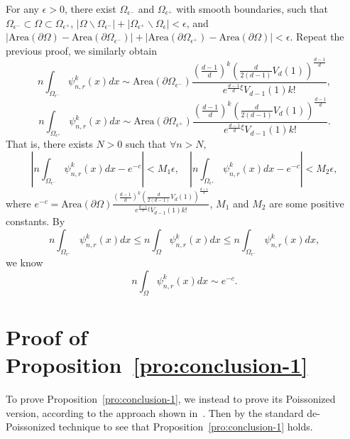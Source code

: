 \documentclass[preprint,12pt]{elsarticle}
\begin{document}
 For any $\epsilon>0$, there exist  $\Omega_{\epsilon^-} $  and $  \Omega_{\epsilon^+}$ with smooth boundaries, such that $\Omega_{\epsilon^-}\subset \Omega\subset \Omega_{\epsilon^+}$, $|\Omega \backslash \Omega_{\epsilon^-}|+|\Omega_{\epsilon^+} \backslash \Omega_{\epsilon}|<\epsilon$, and
$|\mathrm{Area}(\partial\Omega )-\mathrm{Area}(\partial\Omega_{\epsilon^-})|
+|\mathrm{Area}(\partial\Omega_{\epsilon^+})-\mathrm{Area}(\partial\Omega )|<\epsilon$.
Repeat the previous proof, we similarly obtain
\begin{equation}
  n\int_{\Omega_{\epsilon^-}}\psi^k_{n,r}(x)dx \sim \mathrm{Area}(\partial\Omega_{\epsilon^-})  \frac{\left(\frac{d-1}{d}\right)^k\left(\frac{d}{2(d-1)}V_d(1)\right)^{\frac{d-1}{d}}}{e^{\frac{d-1}{d}\xi}{V_{d-1}(1)}k!},
  \end{equation}
\begin{equation}
  n\int_{\Omega_{\epsilon^+}}\psi^k_{n,r}(x)dx \sim \mathrm{Area}(\partial\Omega_{\epsilon^+})  \frac{\left(\frac{d-1}{d}\right)^k\left(\frac{d}{2(d-1)}V_d(1)\right)^{\frac{d-1}{d}}}{e^{\frac{d-1}{d}\xi}{V_{d-1}(1)}k!}.
\end{equation}
That is, there exists $N>0$ such that $\forall n>N$,
\begin{equation}
 \left|n\int_{\Omega_{\epsilon^-}}\psi^k_{n,r}(x)dx-e^{-c} \right|<M_1\epsilon, \quad \left|n\int_{\Omega_{\epsilon^+}}\psi^k_{n,r}(x)dx-e^{-c} \right|<M_2\epsilon,
\end{equation}
where $e^{-c}= \mathrm{Area}(\partial\Omega)  \frac{\left(\frac{d-1}{d}\right)^k\left(\frac{d}{2(d-1)}V_d(1)\right)^{\frac{d-1}{d}}}{e^{\frac{d-1}{d}\xi}{V_{d-1}(1)}k!}$,
 $M_1$ and $M_2$ are some positive constants.
By
$$
         n\int_{\Omega_{\epsilon^-}}\psi^k_{n,r}(x)dx   \leq n\int_{\Omega }\psi^k_{n,r}(x)dx \leq n\int_{\Omega_{\epsilon^-}}\psi^k_{n,r}(x)dx,
$$
we know
$$
         n\int_{\Omega }\psi^k_{n,r}(x)dx  \sim e^{-c}.
$$



\section{Proof of Proposition~\ref{pro:conclusion-1}}\label{sec:Poissonized-section}

To prove  Proposition~\ref{pro:conclusion-1}, we  instead to prove  its Poissonized version, according to the approach
shown in~\cite{Ding-RGG2018, Ding-RGG2025, Ding2022-3DRadii}.
Then by the standard de-Poissonized technique to see that Proposition~\ref{pro:conclusion-1} holds.
\end{document}
